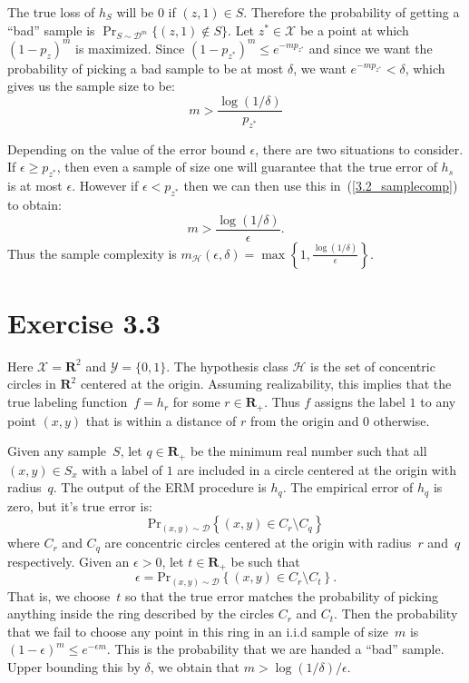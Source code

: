 \documentclass[11pt]{article}
\theoremstyle{definition}
\newcommand{\samplecomp}[2]{m_{\mathcal{H}}(#1, #2)}
\newcommand{\hypclass}{\ensuremath{\mathcal{H}}}
\newcommand{\dom}{\ensuremath{\mathcal{X}}}
\newcommand{\range}{\ensuremath{\mathcal{Y}}}
\newcommand{\dist}{\ensuremath{\mathcal{D}}}
\newcommand{\Rpos}{\ensuremath{\mathbf{R}_{+}}}
\newcommand{\Rtwo}{\ensuremath{\mathbf{R}^2}}
\newcommand{\Prtwo}[2]{\text{Pr}_{#1} \left \{ #2 \right \}}
\begin{document}
The true loss of $h_S$ will be $0$ if $(z, 1) \in S$. Therefore the probability 
of getting a ``bad'' sample is $\Pr_{S \sim \mathcal{D}^m}\{(z, 1) \notin S\}$.
Let $z^{*} \in \mathcal{X}$ be a point at which $(1 - p_z)^m$ is maximized. Since 
$(1 - p_{z^{*}})^m \leq e^{- m p_{z^{*}}}$ and since we want the probability of 
picking a bad sample to be at most $\delta$, we want $e^{- m p_{z^{*}}} < \delta$,
which gives us the sample size to be:
\begin{equation}
\label{3.2_samplecomp}
	m  > \frac{\log (1 / \delta)}{p_{z^{*}}}
\end{equation}

Depending on the value of the error bound $\epsilon$, there are two situations to consider. If $\epsilon \geq p_{z^{*}}$, then even a sample of size one will guarantee 
that the true error of $h_s$ is at most $\epsilon$. However if 
$\epsilon < p_{z^{*}}$ then we can then use this in~(\ref{3.2_samplecomp})
to obtain: 
\[
    m > \frac{\log (1 / \delta)}{\epsilon}.
\]
Thus the sample complexity is $\samplecomp{\epsilon}{\delta} = 
\max \left \{1, \frac{\log (1 / \delta)}{\epsilon} \right \}$.

\section*{Exercise 3.3}

Here $\dom = \Rtwo$ and $\range = \{0, 1\}$. The hypothesis class $\hypclass$ is the set of concentric circles in $\Rtwo$ centered at the origin. Assuming realizability, this implies that the true labeling function~$f = h_r$ for some $r \in \Rpos$. Thus $f$ assigns the label $1$ to any point $(x, y) $ that is within a distance of $r$ from the origin and $0$ otherwise. 

Given any sample~$S$, let $q \in \Rpos$ be the minimum real number such that all $(x, y) \in S_x$ with a label of $1$ are included in a circle centered at the origin with radius~$q$. The output of the ERM procedure is $h_q$. The empirical error of $h_q$ is zero, but it's true error is:
\[
	\Prtwo{(x, y) \sim \dist}{(x, y) \in C_r \setminus C_q}
\]
where $C_r$ and $C_q$ are concentric circles centered at the origin with radius~$r$ and~$q$ respectively. Given an $\epsilon > 0$, let $t \in \Rpos$ be such that 
$$\epsilon = \Prtwo{(x, y) \sim \dist}{(x, y) \in C_r \setminus C_t}.$$ 
That is, we choose~$t$ so that the true error matches the probability of picking anything inside the ring described by the circles $C_r$ and $C_t$. Then the probability that we fail to choose any point in this ring in an i.i.d sample of size~$m$ is $(1 - \epsilon)^m \leq e^{- \epsilon m}$. This is the probability that we are handed a ``bad'' sample. Upper bounding this by $\delta$, we obtain that $m > \log(1 / \delta) / \epsilon$.
\end{document}
